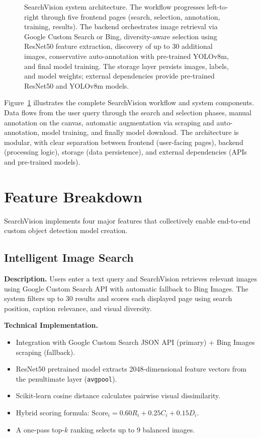 \documentclass[12pt, letterpaper]{article}
\begin{document}
\begin{figure}[H]
\begin{tikzpicture}
  \end{tikzpicture}
  \caption{SearchVision system architecture. The workflow progresses left-to-right through
           five frontend pages (search, selection, annotation, training, results). The backend
           orchestrates image retrieval via Google Custom Search or Bing, diversity-aware
           selection using ResNet50 feature extraction, discovery of up to 30 additional images,
           conservative auto-annotation with pre-trained YOLOv8m, and final model training. The storage
           layer persists images, labels, and model weights; external dependencies provide
           pre-trained ResNet50 and YOLOv8m models.}
  \label{fig:system-architecture}
\end{figure}

Figure~\ref{fig:system-architecture} illustrates the complete SearchVision workflow and system 
components. Data flows from the user query through the search and selection phases, manual 
annotation on the canvas, automatic augmentation via scraping and auto-annotation, model training, 
and finally model download. The architecture is modular, with clear separation between frontend 
(user-facing pages), backend (processing logic), storage (data persistence), and external 
dependencies (APIs and pre-trained models).

\section{Feature Breakdown}

SearchVision implements four major features that collectively enable end-to-end custom
object detection model creation.

\subsection{Intelligent Image Search}

\textbf{Description.} Users enter a text query and SearchVision retrieves relevant images
using Google Custom Search API with automatic fallback to Bing Images. The system filters
up to 30 results and scores each displayed page using search position, caption relevance,
and visual diversity.

\textbf{Technical Implementation.}
\begin{itemize}
  \item Integration with Google Custom Search JSON API (primary) + Bing Images scraping (fallback).
  \item ResNet50 \cite{he2016deep} pretrained model extracts 2048-dimensional feature vectors from the
    penultimate layer (\texttt{avgpool}).
  \item Scikit-learn cosine distance calculates pairwise visual dissimilarity.
  \item Hybrid scoring formula: $\text{Score}_i = 0.60R_i + 0.25C_i + 0.15D_i$.
  \item A one-pass top-$k$ ranking selects up to 9 balanced images.
\end{itemize}
\end{document}
